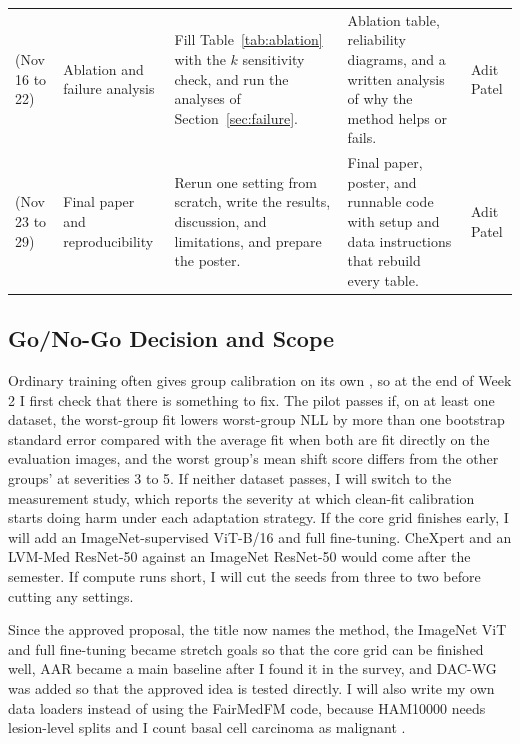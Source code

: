 \documentclass[sigconf,nonacm]{acmart}
\begin{document}
\begin{table}[t]
\begin{tabularx}{\textwidth}{@{}P{1.3cm}P{2.1cm}LP{4.6cm}P{1.15cm}@{}}
     (Nov 16 to 22) & Ablation and failure analysis & Fill Table~\ref{tab:ablation} with the $k$ sensitivity check, and run the analyses of Section~\ref{sec:failure}. & Ablation table, reliability diagrams, and a written analysis of why the method helps or fails. & Adit Patel \\
     (Nov 23 to 29) & Final paper and reproducibility & Rerun one setting from scratch, write the results, discussion, and limitations, and prepare the poster. & Final paper, poster, and runnable code with setup and data instructions that rebuild every table. & Adit Patel \\
    \bottomrule
  \end{tabularx}
\end{table}

\subsection{Go/No-Go Decision and Scope}
\label{sec:gonogo}

Ordinary training often gives group calibration on its own \cite{liu2019implicit}, so at the end of Week 2 I first check that there is something to fix. The pilot passes if, on at least one dataset, the worst-group fit lowers worst-group NLL by more than one bootstrap standard error compared with the average fit when both are fit directly on the evaluation images, and the worst group's mean shift score differs from the other groups' at severities 3 to 5. If neither dataset passes, I will switch to the measurement study, which reports the severity at which clean-fit calibration starts doing harm under each adaptation strategy. If the core grid finishes early, I will add an ImageNet-supervised ViT-B/16 \cite{dosovitskiy2021vit} and full fine-tuning. CheXpert \cite{irvin2019chexpert} and an LVM-Med ResNet-50 against an ImageNet ResNet-50 \cite{nguyen2023lvmmed,he2016resnet} would come after the semester. If compute runs short, I will cut the seeds from three to two before cutting any settings.

Since the approved proposal, the title now names the method, the ImageNet ViT and full fine-tuning became stretch goals so that the core grid can be finished well, AAR became a main baseline after I found it in the survey, and DAC-WG was added so that the approved idea is tested directly. I will also write my own data loaders instead of using the FairMedFM code, because HAM10000 needs lesion-level splits and I count basal cell carcinoma as malignant \cite{zong2023medfair}.
\end{document}
